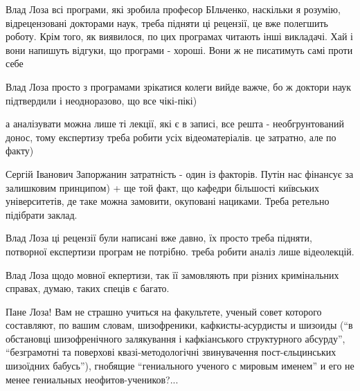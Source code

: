 \begin{itemize}
\begin{itemize}

Влад Лоза всі програми, які зробила професор БІльченко, наскільки я розумію,
відрецензовані докторами наук, треба підняти ці рецензії, це вже полегшить
роботу. Крім того, як виявилося, по цих програмах читають інші викладачі. Хай і
вони напишуть відгуки, що програми - хороші. Вони ж не писатимуть самі проти
себе


Влад Лоза просто з програмами зрікатися колеги вийде важче, бо ж доктори наук
підтвердили і неодноразово, що все чікі-пікі)


а аналізувати можна лише ті лекції, які є в записі, все решта - необгрунтований
донос, тому експертизу треба робити усіх відеоматеріалів. це затратно, але по
факту)


Сергій Іванович Запоржанин затратність - один із факторів. Путін нас фінансує
за залишковим принципом) + ще той факт, що кафедри більшості київських
університетів, де таке можна замовити, окуповані нациками. Треба ретельно
підібрати заклад.


Влад Лоза ці рецензії були написані вже давно, їх просто треба підняти,
потворної експертизи програм не потрібно. треба робити аналіз лише відеолекцій.


Влад Лоза щодо мовної екпертизи, так її замовляють при різних кримінальних
справах, думаю, таких спеців є багато.

\end{itemize}


Пане Лоза! Вам не страшно учиться на факультете, ученый совет которого
составляют, по вашим словам, шизофреники, кафкисты-асурдисты и шизоиды
(\enquote{в обстановці шизофренічного залякування і кафкіанського структурного
абсурду}, \enquote{безграмотні та поверхові квазі-методологічні звинувачення
пост-єльцинських шизоїдних бабусь}), гнобящие \enquote{гениального ученого с
мировым именем} и его не менее гениальных неофитов-учеников?...

\end{itemize}
